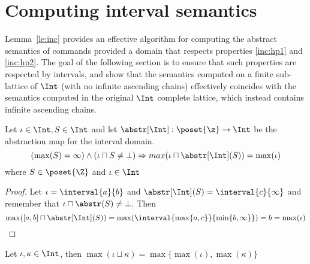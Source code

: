 \section{Computing interval semantics}
\label{sec:computingint}

Lemma~\ref{le:inc} provides an effective algorithm for computing the abstract
semantics of commands provided a domain that respects properties \ref{inc:hp1}
and \ref{inc:hp2}. The goal of the following section is to ensure that such
properties are respected by intervals, and show that the semantics
computed on a finite sub-lattice of \(\Int\) (with no infinite
ascending chains) effectively coincides with the semantics computed in
the original \(\Int\) complete lattice, which instead contains
infinite ascending chains.

\begin{observation}
  Let \(\iota \in \Int, S \in \Int\) and let
  \({\abstr[\Int] : \poset{\z} \to \Int}\) be the abstraction map for
  the interval domain. 
  \begin{equation*}
    \left(\max(S) = \infty\right) \land \left(\iota \sqcap S \neq \bot\right)
    \Rightarrow max(\iota \sqcap \abstr[\Int](S)) = \max(\iota)
  \end{equation*}
  where \(S \in \poset{\Z}\) and \(\iota \in \Int\)
\end{observation}

\begin{proof}
  Let \(\iota = \interval{a}{b}\) and
  \(\abstr[\Int](S) = \interval{c}{\infty}\) and remember that
  \({\iota \sqcap \abstr(S) \neq \bot}\). Then
  \begin{equation*}
    \max([a,b] \sqcap \abstr[\Int](S)) = \max(\interval{\max\{a, c\}}{\min\{b , \infty\}}) = b = \max(\iota) \qedhere
  \end{equation*}
\end{proof}

\begin{observation}
  Let \(\iota, \kappa \in \Int\), then
  \(\max(\iota \sqcup \kappa) = \max\{\max(\iota), \max(\kappa)\}\)
\end{observation}

